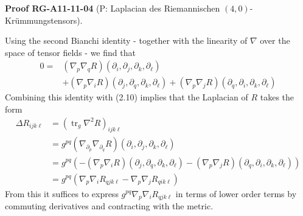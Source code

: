 \documentclass[10pt, letterpaper]{article}
\newcommand{\CustomHeading}[3]{%
  \par\medskip\noindent%
  \textbf{#1 #2} \textnormal{(#3)}.\enskip%
}
\newenvironment{PROOF}[2]{\begin{unitbox}\CustomHeading{Proof}{#1}{#2}}{\end{unitbox}}
\begin{document}
\begin{PROOF}{RG-A11-11-04}{P: Laplacian des Riemannischen $(4,0)$-Krümmungstensors}
Using the second Bianchi identity - together with the linearity of $\nabla$ over the space of tensor fields - we find that
$$
\begin{aligned}
0= & \left(\nabla_{p} \nabla_{q} R\right)\left(\partial_{i}, \partial_{j}, \partial_{k}, \partial_{\ell}\right) \\
& +\left(\nabla_{p} \nabla_{i} R\right)\left(\partial_{j}, \partial_{q}, \partial_{k}, \partial_{\ell}\right)+\left(\nabla_{p} \nabla_{j} R\right)\left(\partial_{q}, \partial_{i}, \partial_{k}, \partial_{\ell}\right)
\end{aligned}
$$
Combining this identity with (2.10) implies that the Laplacian of $R$ takes the form
$$
\begin{aligned}
\Delta R_{i j k \ell} & =\left(\operatorname{tr}_{g} \nabla^{2} R\right)_{i j k \ell} \\
& =g^{p q}\left(\nabla_{\partial_{p}} \nabla_{\partial_{q}} R\right)\left(\partial_{i}, \partial_{j}, \partial_{k}, \partial_{\ell}\right) \\
& =g^{p q}\left(-\left(\nabla_{p} \nabla_{i} R\right)\left(\partial_{j}, \partial_{q}, \partial_{k}, \partial_{\ell}\right)-\left(\nabla_{p} \nabla_{j} R\right)\left(\partial_{q}, \partial_{i}, \partial_{k}, \partial_{\ell}\right)\right) \\
& =g^{p q}\left(\nabla_{p} \nabla_{i} R_{q j k \ell}-\nabla_{p} \nabla_{j} R_{q i k \ell}\right)
\end{aligned}
$$
From this it suffices to express $g^{p q} \nabla_{p} \nabla_{i} R_{q j k \ell}$ in terms of lower order terms by commuting derivatives and contracting with the metric.


\end{PROOF}
\end{document}

